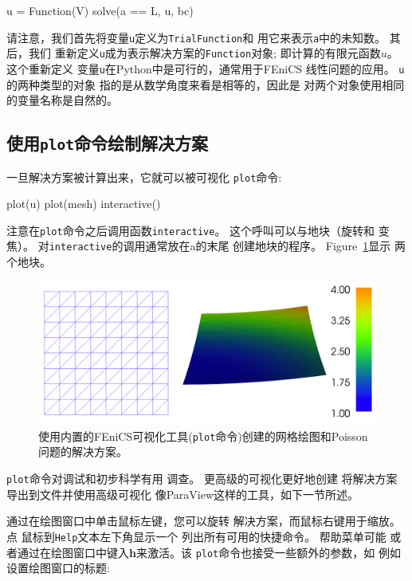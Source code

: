 \begin{python}
u = Function(V)
solve(a == L, u, bc)
\end{python}

请注意，我们首先将变量\texttt{u}定义为\texttt{TrialFunction}和
用它来表示\texttt{a}中的未知数。 其后，我们
重新定义\texttt{u}成为表示解决方案的\texttt{Function}对象;
即计算的有限元函数$u$。 这个重新定义
变量\texttt{u}在Python中是可行的，通常用于FEniCS
线性问题的应用。 \texttt{u}的两种类型的对象
指的是从数学角度来看是相等的，因此是
对两个对象使用相同的变量名称是自然的。


\subsection{使用\texttt{plot}命令绘制解决方案}


一旦解决方案被计算出来，它就可以被可视化
\texttt{plot}命令:

\begin{python}
plot(u)
plot(mesh)
interactive()
\end{python}
注意在\texttt{plot}命令之后调用函数\texttt{interactive}。
这个呼叫可以与地块（旋转和
变焦）。 对\texttt{interactive}的调用通常放在a的末尾
创建地块的程序。 Figure~\ref{fig:poisson_plot}显示
两个地块。

\begin{figure}[!ht]  %
 \centerline{\includegraphics[width=0.95\linewidth]{fig/poisson_plot.png}}
 \caption{
 使用内置的FEniCS可视化工具(\texttt{plot}命令)创建的网格绘图和Poisson问题的解决方案。\label{fig:poisson_plot}
 }
\end{figure}

\texttt{plot}命令对调试和初步科学有用
调查。 更高级的可视化更好地创建
将解决方案导出到文件并使用高级可视化
像ParaView这样的工具，如下一节所述。

通过在绘图窗口中单击鼠标左键，您可以旋转
解决方案，而鼠标右键用于缩放。 点
鼠标到\texttt{Help}文本左下角显示一个
列出所有可用的快捷命令。 帮助菜单可能
或者通过在绘图窗口中键入\textbf{h}来激活。该
\texttt{plot}命令也接受一些额外的参数，如
例如设置绘图窗口的标题:

